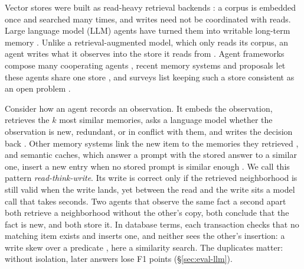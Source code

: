 \documentclass[sigconf, nonacm, review]{acmart}
\begin{document}
Vector stores were built as read-heavy retrieval backends
\cite{DBLP:conf/nips/LewisPPPKGKLYRRK20,DBLP:journals/vldb/PanWL24,DBLP:conf/sigmod/WangYGJXLWGLXYYZLCLZMGJWX21,DBLP:journals/pvldb/GuoLXYYLCXLLCQWTX22}:
a corpus is embedded once and searched many times, and writes need not
be coordinated with reads. Large language model (LLM) agents have turned them into
writable long-term memory
\cite{DBLP:journals/corr/abs-2310-08560,DBLP:conf/uist/ParkOCMLB23,DBLP:conf/ecai/ChhikaraKASY25,DBLP:conf/nips/XuLMGTZ25,DBLP:journals/corr/abs-2501-13956,DBLP:conf/aaai/ZhongGGYW24,DBLP:journals/tois/ZhangDBMLCZDW25,DBLP:journals/tmlr/SumersYNG24,DBLP:journals/corr/abs-2512-13564}.
Unlike a retrieval-augmented model, which only reads its corpus, an
agent writes what it observes into the store it reads from
\cite{DBLP:journals/tmlr/SumersYNG24}. Agent frameworks compose many
cooperating agents
\cite{DBLP:conf/colm/WuBZWLZJZZLAWBW24,DBLP:conf/iclr/HongZCZCWZWYLZRXWS24,DBLP:conf/nips/LiHIKG23},
recent memory systems and proposals let these agents share one store
\cite{DBLP:journals/corr/abs-2507-07957,DBLP:conf/nips/ZhangFWWYY25,DBLP:journals/corr/abs-2505-18279,DBLP:journals/corr/abs-2606-24535,DBLP:journals/corr/abs-2603-10062},
and surveys list keeping such a store consistent as an open problem
\cite{DBLP:journals/tois/ZhangDBMLCZDW25,DBLP:journals/corr/abs-2512-13564}.

Consider how an agent records an observation. It embeds the
observation, retrieves the $k$ most similar memories, asks a language
model whether the observation is new, redundant, or in conflict with
them, and writes the decision back
\cite{DBLP:conf/ecai/ChhikaraKASY25,DBLP:journals/corr/abs-2501-13956}.
Other memory systems link the new item to the memories they retrieved
\cite{DBLP:conf/nips/XuLMGTZ25,DBLP:conf/nips/ZhangFWWYY25}, and
semantic caches, which answer a prompt with the stored answer to a
similar one, insert a new entry when no stored prompt is similar enough
\cite{DBLP:conf/nlposs/Bang23,DBLP:conf/iclr/SchroederDCCLZKKZG26}. We
call this pattern \emph{read-think-write}. Its write is correct only if
the retrieved neighborhood is still valid when the write lands, yet
between the read and the write sits a model call that takes seconds.
Two agents that observe the same fact a second apart both retrieve a
neighborhood without the other's copy, both conclude that the fact is
new, and both store it. In database terms, each transaction checks that
no matching item exists and inserts one, and neither sees the other's
insertion: a write skew over a predicate
\cite{DBLP:conf/sigmod/BerensonBGMOO95,DBLP:journals/tods/FeketeLOOS05},
here a similarity search. The duplicates matter: without isolation, later
answers lose  F1 points (\S\ref{sec:eval-llm}).
\end{document}
